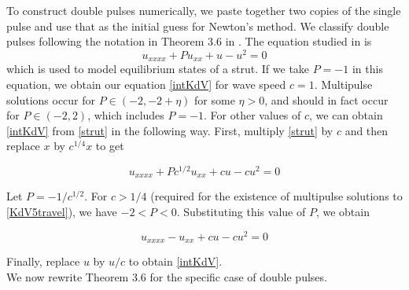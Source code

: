 \documentclass[12pt]{article}
\begin{document}
To construct double pulses numerically, we paste together two copies of the single pulse and use that as the initial guess for Newton's method. We classify double pulses following the notation in Theorem 3.6 in \cite{Sandstede1997}. The equation studied in \cite{Sandstede1997} is
\begin{equation}\label{strut}
u_{xxxx} + Pu_{xx} + u - u^2 = 0
\end{equation}
which is used to model equilibrium states of a strut. If we take $P = -1$ in this equation, we obtain our equation \eqref{intKdV} for wave speed $c = 1$. Multipulse solutions occur for $P \in (-2, -2 + \eta)$ for some $\eta > 0$, and should in fact occur for $P \in (-2, 2)$, which includes $P = -1$. For other values of $c$, we can obtain \eqref{intKdV} from \eqref{strut} in the following way. First, multiply \eqref{strut} by $c$ and then replace $x$ by $c^{1/4} x$ to get

\begin{equation*}
u_{xxxx} + Pc^{1/2}u_{xx} + c u - c u^2 = 0 
\end{equation*}

Let $P = -1 / c^{1/2}$. For $c > 1/4$ (required for the existence of multipulse solutions to \eqref{KdV5travel}), we have $-2 < P < 0$. Substituting this value of $P$, we obtain

\begin{equation*}
u_{xxxx} - u_{xx} + c u - c u^2 = 0 
\end{equation*}

Finally, replace $u$ by $u/c$ to obtain \eqref{intKdV}.\\

We now rewrite Theorem 3.6 for the specific case of double pulses. 
\end{document}
